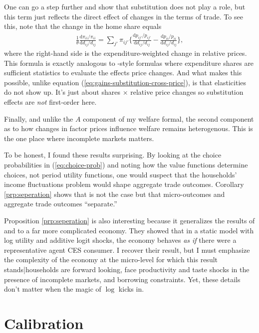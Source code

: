 \documentclass[12pt,pdftex]{article}
\begin{document}
\begin{onehalfspacing}
One can go a step further and show that substitution does not play a role, but this term just reflects the direct effect of changes in the terms of trade. To see this, note that the change in the home share equals
\begin{align}
\frac{1}{\theta} \frac{\mathrm{d} \pi_{ii} / \pi_{ii}}{\mathrm{d}d_{ij} / d_{ij}} = \sum_{j'} \pi_{ij'} \bigg \{  \frac{\mathrm{d} p_{ij'} / p_{ij'}}{\mathrm{d}d_{ij} / d_{ij}} - \frac{\mathrm{d} p_{ii} / p_{ii}}{\mathrm{d}d_{ij} / d_{ij}} \bigg \},
\end{align}
where the right-hand side is the expenditure-weighted change in relative prices. This formula is exactly analogous to \citet{deaton1989rice}-style formulas where expenditure shares are sufficient statistics to evaluate the effects price changes. And what makes this possible, unlike equation (\ref{eq:gains-substitution-cross-price}), is that elasticities do not show up. It's just about shares $\times$ relative price changes so substitution effects are \emph{not} first-order here.

Finally, and unlike the $A$ component of my welfare formal, the second component as to how changes in factor prices influence welfare remains heterogenous. This is the one place where incomplete markets matters.

To be honest, I found these results surprising. By looking at the choice probabilities in (\ref{eq:choice-prob}) and noting how the value functions determine choices, not period utility functions, one would suspect that the households' income fluctuations problem would shape aggregate trade outcomes. Corollary \ref{prp:seperation} shows that is not the case but that micro-outcomes and aggregate trade outcomes ``separate.''

Proposition \ref{prp:seperation} is also interesting because it generalizes the results of \citet{anderson1987ces} and \citet{anderson1992discrete} to a far more complicated economy. They showed that in a static model with log utility and additive logit shocks, the economy behaves \emph{as if} there were a representative agent CES consumer. I recover their result, but I must emphasize the complexity of the economy at the micro-level for which this result stands|households are forward looking, face productivity and taste shocks in the presence of incomplete markets, and borrowing constraints. Yet, these details don't matter when the magic of $\log$ kicks in.

\section{Calibration}


\end{onehalfspacing}
\end{document}
